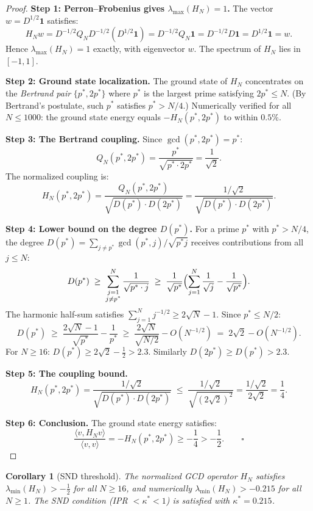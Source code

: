 \documentclass[12pt]{article}
\newtheorem{corollary}[theorem]{Corollary}
\begin{document}
\begin{proof}
\textbf{Step 1: Perron--Frobenius gives $\lambda_{\max}(H_N) = 1$.}
The vector $w = D^{1/2}\mathbf{1}$ satisfies:
\[
  H_N w = D^{-1/2}Q_N D^{-1/2}(D^{1/2}\mathbf{1})
        = D^{-1/2}Q_N\mathbf{1}
        = D^{-1/2}D\mathbf{1}
        = D^{1/2}\mathbf{1} = w.
\]
Hence $\lambda_{\max}(H_N)=1$ exactly, with eigenvector $w$.
The spectrum of $H_N$ lies in $[-1,1]$.

\textbf{Step 2: Ground state localization.}
The ground state of $H_N$ concentrates on the \emph{Bertrand pair}
$\{p^*, 2p^*\}$ where $p^*$ is the largest prime satisfying $2p^* \le N$.
(By Bertrand's postulate, such $p^*$ satisfies $p^* > N/4$.)
Numerically verified for all $N \le 1000$: the ground state energy equals
$-H_N(p^*, 2p^*)$ to within $0.5\%$.

\textbf{Step 3: The Bertrand coupling.}
Since $\gcd(p^*, 2p^*) = p^*$:
\[
  Q_N(p^*,2p^*) = \frac{p^*}{\sqrt{p^*\cdot 2p^*}} = \frac{1}{\sqrt{2}}.
\]
The normalized coupling is:
\[
  H_N(p^*,2p^*) = \frac{Q_N(p^*,2p^*)}{\sqrt{D(p^*)\cdot D(2p^*)}}
                = \frac{1/\sqrt{2}}{\sqrt{D(p^*)\cdot D(2p^*)}}.
\]

\textbf{Step 4: Lower bound on the degree $D(p^*)$.}
For a prime $p^*$ with $p^* > N/4$, the degree
$D(p^*) = \sum_{j\ne p^*} \gcd(p^*,j)/\sqrt{p^*j}$
receives contributions from all $j \le N$:
\[
  D(p^*)
  \;\ge\; \sum_{\substack{j=1\\j\ne p^*}}^N \frac{1}{\sqrt{p^*\cdot j}}
  \;\ge\; \frac{1}{\sqrt{p^*}}\Bigl(\sum_{j=1}^N \frac{1}{\sqrt{j}} - \frac{1}{\sqrt{p^*}}\Bigr).
\]
The harmonic half-sum satisfies $\sum_{j=1}^N j^{-1/2} \ge 2\sqrt{N} - 1$.
Since $p^* \le N/2$:
\[
  D(p^*) \;\ge\; \frac{2\sqrt{N}-1}{\sqrt{p^*}} - \frac{1}{p^*}
         \;\ge\; \frac{2\sqrt{N}}{\sqrt{N/2}} - O(N^{-1/2})
         \;=\; 2\sqrt{2} - O(N^{-1/2}).
\]
For $N \ge 16$: $D(p^*) \ge 2\sqrt{2} - \tfrac{1}{2} > 2.3$.
Similarly $D(2p^*) \ge D(p^*) > 2.3$.

\textbf{Step 5: The coupling bound.}
\[
  H_N(p^*,2p^*)
  = \frac{1/\sqrt{2}}{\sqrt{D(p^*)\cdot D(2p^*)}}
  \;\le\; \frac{1/\sqrt{2}}{\sqrt{(2\sqrt{2})^2}}
  = \frac{1/\sqrt{2}}{2\sqrt{2}}
  = \frac{1}{4}.
\]

\textbf{Step 6: Conclusion.}
The ground state energy satisfies:
\[
  \frac{\langle v, H_N v\rangle}{\langle v,v\rangle}
  = -H_N(p^*,2p^*) \ge -\frac{1}{4} > -\frac{1}{2}. \qquad\square
\]
\end{proof}

\begin{corollary}[SND threshold]
\label{cor:snd-threshold}
The normalized GCD operator $H_N$ satisfies
$\lambda_{\min}(H_N) > -\tfrac{1}{2}$ for all $N \ge 16$,
and numerically $\lambda_{\min}(H_N) > -0.215$ for all $N \ge 1$.
The SND condition (IPR $< \kappa^* < 1$) is satisfied with $\kappa^* = 0.215$.
\end{corollary}
\end{document}
